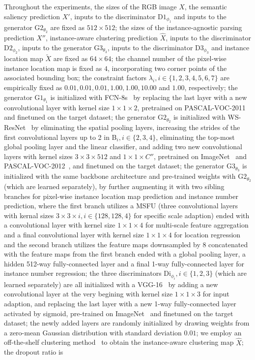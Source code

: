 \documentclass[10pt,twocolumn,letterpaper]{article}
\theoremstyle{definition}
\theoremstyle{remark}
\begin{document}
Throughout the experiments, the sizes of the RGB image $X$, the semantic saliency prediction $X{'}$, inputs to the discriminator $\mathrm{D1}_{\phi_1}$ and inputs to the generator $\mathrm{G2}_{\theta_2}$ are fixed as $512 {\times} 512$; the sizes of the instance-agnostic parsing prediction $X{''}$, instance-aware clustering prediction $\hat{X}$, inputs to the discriminator $\mathrm{D2}_{\phi_2}$, inputs to the generator $\mathrm{G3}_{\theta_3}$, inputs to the discriminator $\mathrm{D3}_{\phi_3}$ and instance location map $\tilde{X}$ are fixed as $64 {\times} 64$; the channel number of the pixel-wise instance location map is fixed as $4$, incorporating two corner points of the associated bounding box; the constraint factors $\lambda_i, i\in \{1,2,3,4,5,6,7\}$ are empirically fixed as $0.01, 0.01, 0.01, 1.00, 1.00, 10.00$ and $1.00$, respectively; the generator $\mathrm{G1}_{\theta_1}$ is initialized with FCN-8s~\cite{long2015fully} by replacing the last layer with a new convolutional layer with kernel size $1\times 1\times 2$, pretrained on PASCAL-VOC-2011~\cite{pascal-voc-2011} and finetuned on the target dataset; the generator $\mathrm{G2}_{\theta_2}$ is initialized with WS-ResNet~\cite{wu2016wider} by eliminating the spatial pooling layers, increasing the strides of the first convolutional layers up to 2 in B$_i, i\in \{2,3,4\}$, eliminating the top-most global pooling layer and the linear classifier, and adding two new convolutional layers with kernel sizes $3\times 3\times 512$ and $1\times 1\times C{''}$, pretrained on ImageNet~\cite{russakovsky2015imagenet} and PASCAL-VOC-2012~\cite{everingham2015pascal}, and finetuned on the target dataset; the generator $\mathrm{G3}_{\theta_3}$ is initialized with the same backbone architecture and pre-trained weights with $\mathrm{G2}_{\theta_2}$ (which are learned separately), by further augmenting it with two sibling branches for pixel-wise instance location map prediction and instance number prediction, where the first branch utilizes a MSFU (three convolutional layers with kernal sizes $3\times 3\times i, i\in \{128,128,4\}$ for specific scale adaption) ended with a convolutional layer with kernel size $1\times 1\times 4$ for multi-scale feature aggregation and a final convolutional layer with kernel size $1\times 1\times 4$ for location regression and the second branch utilizes the feature maps downsampled by 8 concatenated with the feature maps from the first branch ended with a global pooling layer, a hidden 512-way fully-connected layer and a final 1-way fully-connected layer for instance number regression; the three discriminators $\mathrm{Di}_{\phi_i}, i\in \{1,2,3\}$ (which are learned separately) are all initialized with a VGG-16~\cite{simonyan2014very} by adding a new convolutional layer at the very begining with kernel size $1\times 1\times 3$ for input adaption, and replacing the last layer with a new 1-way fully-connected layer activated by sigmoid, pre-trained on ImageNet~\cite{russakovsky2015imagenet} and finetuned on the target dataset; the newly added layers are randomly initialized by drawing weights from a zero-mean Gaussian distribution with standard deviation $0.01$; we employ an off-the-shelf clustering method~\cite{ng2002spectral} to obtain the instance-aware clustering map $\hat{X}$; the dropout ratio is 
\end{document}
